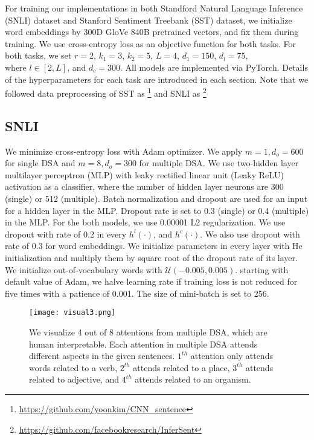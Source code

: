 \documentclass[11pt,a4paper]{article}
\begin{document}
For training our implementations in both Standford Natural Language Inference (SNLI) dataset and Stanford Sentiment Treebank (SST) dataset, we initialize word embeddings by 300D GloVe 840B pretrained vectors, and fix them during training. We use cross-entropy loss as an objective function for both tasks. For both tasks, we set $r=2$, $k_1=3$, $k_2=5$, $L=4$, $d_1=150$, $d_l=75$, $\text{where } l\in[2,L]$, and $d_c=300$. All models are implemented via PyTorch. Details of the hyperparameters for each task are introduced in each section. Note that we followed data preprocessing of SST as \cite{yoonkim}\footnote{\url{https://github.com/yoonkim/CNN_sentence}} and SNLI as \cite{infersent}\footnote{{\url{https://github.com/facebookresearch/InferSent}}}


\subsection{SNLI}

We minimize cross-entropy loss with Adam optimizer. We apply $m=1,d_o=600$ for single DSA and $m=8,d_o=300$ for multiple DSA. We use two-hidden layer multilayer perceptron (MLP) with leaky rectified
linear unit (Leaky ReLU) activation as a classifier, where the number of hidden layer neurons are 300 (single) or 512 (multiple). Batch normalization and dropout are used for an input for a hidden layer in the MLP. Dropout rate is set to 0.3 (single) or 0.4 (multiple) in the MLP. For the both models, we use 0.00001 L2 regularization. We use dropout with rate of 0.2 in every $h^{l}(\cdot)$, and $h^{c}(\cdot)$. We also use dropout with rate of 0.3 for word embeddings. We initialize parameters in every layer with He initialization  and multiply them by square root of the dropout rate of its layer. We initialize out-of-vocabulary words with $\mathcal{U}(-0.005, 0.005)$. starting with default value of Adam, we halve learning rate if training loss is not reduced for five times with a patience of 0.001. The size of mini-batch is set to 256.

\begin{figure*}
        \centering
        \texttt{[image: visual3.png]}
        \caption{We visualize 4 out of 8 attentions from multiple DSA, which are human interpretable. Each attention in multiple DSA attends different aspects in the given sentences. $1^{th}$ attention only attends words related to a verb, $2^{th}$ attends related to a place, $3^{th}$ attends related to adjective, and $4^{th}$ attends related to an organism.}
\end{figure*}
\end{document}
